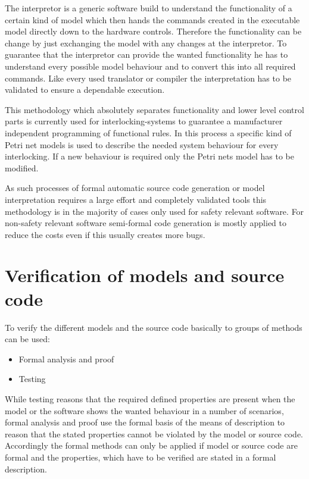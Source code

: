 \documentclass{./template/openetcs2}
\begin{document}
The interpretor is a generic software build to understand the functionality of a certain kind of model which then hands the commands created in the executable model directly down to the hardware controls. Therefore the functionality can be change by just exchanging the model with any changes at the interpretor. To guarantee that the interpretor can provide the wanted functionality he has to understand every possible model behaviour and to convert this into all required commands. Like every used translator or compiler the interpretation has to be validated to ensure a dependable execution.

This methodology which absolutely separates functionality and lower level control parts is currently used for interlocking-systems to guarantee a manufacturer independent programming of functional rules. In this process a specific kind of Petri net models is used to describe the needed system behaviour for every interlocking. If a new behaviour is required only the Petri nets model has to be modified.

As such processes of formal automatic source code generation or model interpretation requires a large effort and completely validated tools this methodology is in the majority of cases only used for safety relevant software.  For non-safety relevant software semi-formal code generation is mostly applied to reduce the costs even if this usually creates more bugs. 

\section{Verification of models and source code}

To verify the different models and the source code basically to groups of methods can be used:
\vspace{-10pt}
\begin{itemize}[topsep=2pt, partopsep=2pt,itemsep=2pt,parsep=2pt]
\item Formal analysis and proof
\item Testing
\end{itemize}

While testing reasons that the required defined properties are present when the model or the software  shows the wanted behaviour in a number of scenarios, formal analysis and proof use the formal basis of the means of description to reason that the stated properties cannot be violated by the model or source code. Accordingly the formal methods can only be applied if  model or source code are formal and the properties, which have to be verified are stated in a formal description. 
\end{document}
